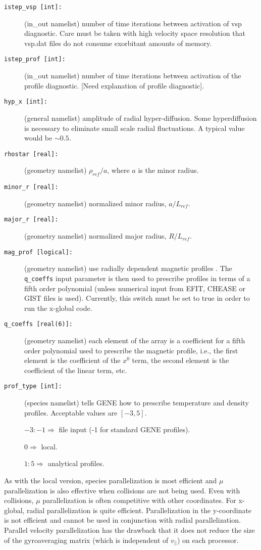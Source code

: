 \documentclass[11pt]{article}
\begin{document}
\begin{titlepage}
\begin{description}
\item[\texttt{istep\_vsp [int]:}] (in\_out namelist) number of time iterations between activation of vsp diagnostic.  Care must be taken with high velocity space resolution that vsp.dat files do not consume exorbitant amounts of memory.
\item[\texttt{istep\_prof [int]:}] (in\_out namelist) number of time iterations between activation of the profile diagnostic.  [Need explanation of profile diagnostic].
\item[\texttt{hyp\_x [int]:}] (general namelist) amplitude of radial hyper-diffusion.  Some hyperdiffusion is necessary to eliminate small scale radial fluctuations.  A typical value would be $\sim0.5$.  
\item[\texttt{rhostar [real]:}] (geometry namelist) $\rho_{ref}/a$, where $a$ is the minor radius. 
\item[\texttt{minor\_r [real]:}] (geometry namelist) normalized minor radius, $a/L_{ref}$. 
\item[\texttt{major\_r [real]:}] (geometry namelist) normalized major radius, $R/L_{ref}$. 
\item[\texttt{mag\_prof [logical]:}] (geometry namelist) use radially dependent magnetic profiles . The \texttt{q\_coeffs} input parameter is then used to prescribe profiles in terms of a fifth order polynomial (unless numerical input from EFIT, CHEASE or GIST files is used). Currently, this switch must be set to true in order to run the x-global code. 
\item[\texttt{q\_coeffs [real(6)]:}] (geometry namelist) each element of the array is a coefficient for a fifth order polynomial used to prescribe the magnetic profile, i.e., the first element is the coefficient of the $x^0$ term, the second element is the coefficient of the linear term, etc. 
\item[\texttt{prof\_type [int]:}] (species namelist) tells GENE how to prescribe temperature and density profiles.  Acceptable values are $[-3,5]$.  

$-3:-1\Rightarrow$ file input (-1 for standard GENE profiles).  

$0\Rightarrow$ local. 

$1:5\Rightarrow$ analytical profiles. 

\end{description}


As with the local version, species parallelization is most efficient and $\mu$ parallelization is also effective when collisions are not being used.  Even with collisions, $\mu$ parallelization is often competitive with other coordinates.  For x-global, radial parallelization is quite efficient.  Parallelization in the y-coordinate is not efficient and cannot be used in conjunction with radial parallelization.  Parallel velocity parallelization has the drawback that it does not reduce the size of the gyroaveraging matrix (which is independent of $v_{||}$) on each processor. 





\end{titlepage}
\end{document}
